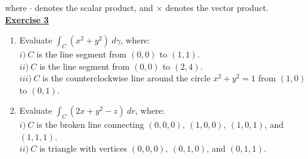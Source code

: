 where $\cdot$ denotes the scalar product, and $\times$ denotes the vector product.\\ \linebreak
\Large{\underline{\textbf{Exercise 3}}}
\normalsize{}
\begin{enumerate}
    \item Evaluate $\displaystyle \int_C(x^2 + y^2)\ d\gamma$, where:\\
        $i)\ C$ is the line segment from $(0,0)$ to $(1,1)$.\\
        $ii)\ C$ is the line segment from $(0,0)$ to $(2,4)$.\\
        $iii)\ C$ is the counterclockwise line around the circle $x^2 + y^2 = 1$ from $(1,0)$ to $(0,1)$.
    \item Evaluate $\displaystyle \int_C(2x + y^2 - z)\ dr$, where:\\
        $i)\ C$ is the broken line connecting $(0,0,0),\ (1,0,0),\ (1,0,1)$, and $(1,1,1)$.\\
        $ii)\ C$ is triangle with vertices $(0,0,0),\ (0,1,0)$, and $(0,1,1)$.\\
\end{enumerate}

